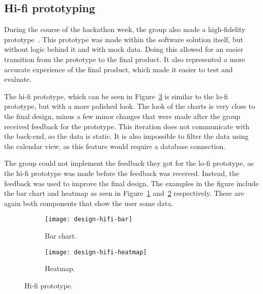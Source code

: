 \subsection{Hi-fi prototyping}\label{subsec:hi-fi-prototyping}

During the course of the hackathon week, the group also made a high-fidelity prototype~\cite{hi-lo-fidelity}.
This prototype was made within the software solution itself, but without logic behind it and with mock data.
Doing this allowed for an easier transition from the prototype to the final product.
It also represented a more accurate experience of the final product, which made it easier to test and evaluate.

The hi-fi prototype, which can be seen in Figure~\ref{fig:hifi-prototype} is similar to the lo-fi prototype, but with a
more polished look.
The look of the charts is very close to the final design, minus a few minor changes that were made after the group
received feedback for the prototype.
This iteration does not communicate with the back-end, so the data is static.
It is also impossible to filter the data using the calendar view, as this feature would require a database connection.

The group could not implement the feedback they got for the lo-fi prototype, as the hi-fi prototype was made before
the feedback was received.
Instead, the feedback was used to improve the final design.
The examples in the figure include the bar chart and heatmap as seen in Figure~\ref{subfig:hifi-bar}
and~\ref{subfig:hifi-heatmap} respectively.
These are again both components that show the user some data.

\begin{figure}[H]
    \centering
    \begin{subfigure}{.75\textwidth}
        \centering
        \texttt{[image: design-hifi-bar]}
        \caption{Bar chart.
        }\label{subfig:hifi-bar}
    \end{subfigure}
    \par\medskip
    \begin{subfigure}{.75\textwidth}
        \centering
        \texttt{[image: design-hifi-heatmap]}
        \caption{Heatmap.
        }\label{subfig:hifi-heatmap}
    \end{subfigure}
    \caption{Hi-fi prototype.
    }\label{fig:hifi-prototype}
\end{figure}
